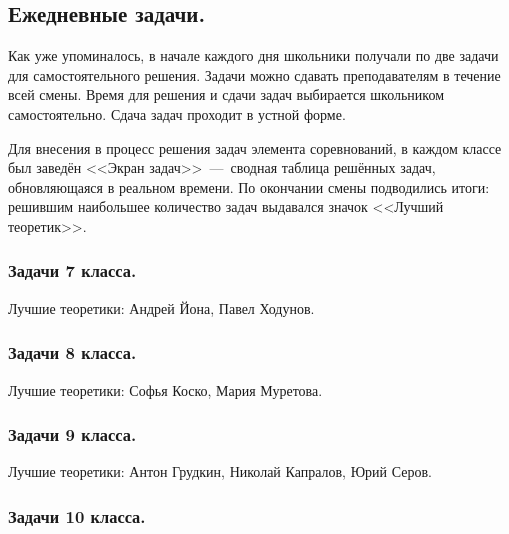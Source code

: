 \documentclass[12pt,a4paper,oneside,draft]{scrartcl}
\newcounter{notask}
\newlength{\h}
\newlength{\x}
\begin{document}
\subsection{Ежедневные задачи.}
\label{sec:2-a-day}

Как уже упоминалось, в начале каждого дня школьники получали по две
задачи для самостоятельного решения. Задачи можно сдавать
преподавателям в течение всей смены. Время для решения и сдачи задач
выбирается школьником самостоятельно. Сдача задач проходит в устной
форме.

Для внесения в процесс решения задач элемента соревнований, в каждом
классе был заведён <<Экран задач>>~---~сводная таблица решённых задач,
обновляющаяся в реальном времени. По окончании смены подводились
итоги: решившим наибольшее количество задач выдавался значок <<Лучший
теоретик>>. 

\subsubsection{Задачи 7 класса.}
\label{sec:2-a-day_7}

\setcounter{notask}{1}
\vspace{1cm}

Лучшие теоретики: Андрей Йона, Павел Ходунов. 

\subsubsection{Задачи 8 класса.}
\label{sec:2-a-day_8}

\setcounter{notask}{1}
\vspace{1cm}

Лучшие теоретики: Софья Коско, Мария Муретова. 

\subsubsection{Задачи 9 класса.}
\label{sec:2-a-day_9}

\setcounter{notask}{1}
\vspace{1cm}

Лучшие теоретики: Антон Грудкин, Николай Капралов, Юрий Серов.

\subsubsection{Задачи 10 класса.}
\label{sec:2-a-day_10}

\setcounter{notask}{1}
\vspace{1cm}
\end{document}
